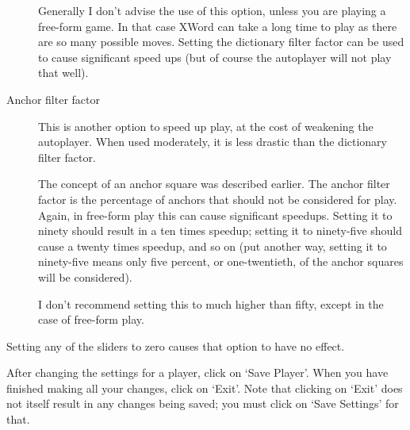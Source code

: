\begin{description}
Generally I don't advise the use of this option, unless you are
playing a free-form game. In that case XWord can take a long
time to play as there are so many possible moves. Setting the 
dictionary filter  factor can be used to cause significant 
speed ups (but of course the autoplayer will not play that well).
\item [Anchor filter factor] This is another option to speed up
play, at the cost of weakening the autoplayer. When used moderately,
it is less drastic than the dictionary filter factor.

The concept of an anchor square was described earlier. The anchor
filter factor is the percentage of anchors that should not be
considered for play. Again, in free-form play this can cause
significant speedups. Setting it to ninety should result in a
ten times speedup; setting it to ninety-five should cause a 
twenty times speedup, and so on (put another way, setting it
to ninety-five means only five percent, or one-twentieth, of the
anchor squares will be considered).

I don't recommend setting this to much higher than fifty, except 
in the case of free-form play.
\end{description}

Setting any of the sliders to zero causes that option to have no
effect.

After changing the settings for a player, click on `Save Player'.
When you have finished making all your changes, click on `Exit'.
Note that clicking on `Exit' does not itself result in any changes
being saved; you must click on `Save Settings' for that.






